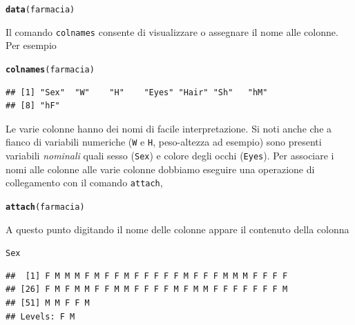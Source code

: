 \documentclass[onecolumn,12pt]{book}\usepackage[]{graphicx}\usepackage[]{color}
\makeatletter
\newcommand{\hlstd}[1]{\textcolor[rgb]{0.345,0.345,0.345}{#1}}%
\newcommand{\hlkwd}[1]{\textcolor[rgb]{0.737,0.353,0.396}{\textbf{#1}}}%
\newenvironment{kframe}{%
 \def\at@end@of@kframe{}%
 \ifinner\ifhmode%
  \def\at@end@of@kframe{\end{minipage}}%
  \begin{minipage}{\columnwidth}%
 \fi\fi%
 \def\FrameCommand##1{\hskip\@totalleftmargin \hskip-\fboxsep
 \colorbox{shadecolor}{##1}\hskip-\fboxsep
     \hskip-\linewidth \hskip-\@totalleftmargin \hskip\columnwidth}%
 \MakeFramed {\advance\hsize-\width
   \@totalleftmargin\z@ \linewidth\hsize
   \@setminipage}}%
 {\par\unskip\endMakeFramed%
 \at@end@of@kframe}
\newenvironment{knitrout}{}{} %
\makeatother
\begin{document}
\begin{knitrout}
\color{fgcolor}\begin{kframe}
\begin{alltt}
\hlkwd{data}\hlstd{(farmacia)}
\end{alltt}
\end{kframe}
\end{knitrout}
Il comando \texttt{colnames}  consente di  visualizzare o assegnare il nome alle colonne.
Per esempio
\begin{knitrout}
\color{fgcolor}\begin{kframe}
\begin{alltt}
\hlkwd{colnames}\hlstd{(farmacia)}
\end{alltt}
\begin{verbatim}
## [1] "Sex"  "W"    "H"    "Eyes" "Hair" "Sh"   "hM"  
## [8] "hF"
\end{verbatim}
\end{kframe}
\end{knitrout}
Le varie colonne hanno dei nomi di facile interpretazione. Si noti anche che a fianco di variabili numeriche (\texttt{W} e \texttt{H}, peso-altezza ad esempio) sono presenti variabili  \emph {nominali} quali sesso (\texttt{Sex}) e colore degli occhi (\texttt{Eyes}).
Per associare i nomi alle colonne  alle varie colonne dobbiamo eseguire una operazione di collegamento con il comando \texttt{attach},
\begin{knitrout}
\color{fgcolor}\begin{kframe}
\begin{alltt}
\hlkwd{attach}\hlstd{(farmacia)}
\end{alltt}
\end{kframe}
\end{knitrout}
A questo punto digitando il nome delle colonne appare il contenuto della colonna
\begin{knitrout}
\color{fgcolor}\begin{kframe}
\begin{alltt}
\hlstd{Sex}
\end{alltt}
\begin{verbatim}
##  [1] F M M M F M F F M F F F F F M F F F M M M F F F F
## [26] F M F M M F F M M F F F F M F M M F F F F F F F M
## [51] M M F F M
## Levels: F M
\end{verbatim}
\end{kframe}
\end{knitrout}
\end{document}
